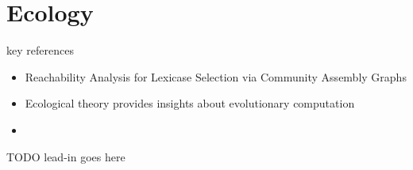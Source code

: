 \section{Ecology}
\label{sec:ecology}

key references
\begin{itemize}
  \item Reachability Analysis for Lexicase Selection via Community Assembly Graphs \citep{dolson2024reachability}
  \item Ecological theory provides insights about evolutionary computation \citep{dolson2018ecological}
  \item
\end{itemize}

TODO lead-in goes here




